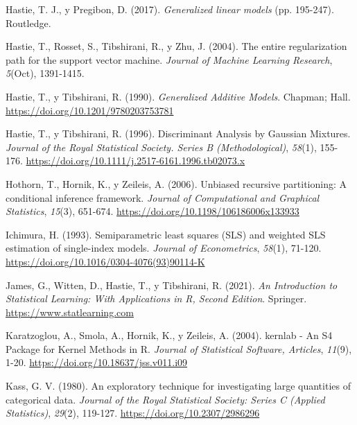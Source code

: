 \documentclass[
]{book}
\newlength{\cslhangindent}
\newlength{\cslentryspacingunit} %
\newenvironment{CSLReferences}[2] %
 {%
  \setlength{\parindent}{0pt}
  \ifodd #1
  \let\oldpar\par
  \def\par{\hangindent=\cslhangindent\oldpar}
  \fi
  \setlength{\parskip}{#2\cslentryspacingunit}
 }%
 {}
\theoremstyle{break}
\theoremstyle{nonumberplain}
\begin{document}
\begin{CSLReferences}{1}{0}
\leavevmode{}%
Hastie, T. J., y Pregibon, D. (2017). \emph{Generalized linear models} (pp. 195-247). Routledge.

\leavevmode{}%
Hastie, T., Rosset, S., Tibshirani, R., y Zhu, J. (2004). The entire regularization path for the support vector machine. \emph{Journal of Machine Learning Research}, \emph{5}(Oct), 1391-1415.

\leavevmode{}%
Hastie, T., y Tibshirani, R. (1990). \emph{Generalized Additive Models}. Chapman; Hall. \url{https://doi.org/10.1201/9780203753781}

\leavevmode{}%
Hastie, T., y Tibshirani, R. (1996). Discriminant Analysis by Gaussian Mixtures. \emph{Journal of the Royal Statistical Society. Series B (Methodological)}, \emph{58}(1), 155-176. \url{https://doi.org/10.1111/j.2517-6161.1996.tb02073.x}

\leavevmode{}%
Hothorn, T., Hornik, K., y Zeileis, A. (2006). Unbiased recursive partitioning: A conditional inference framework. \emph{Journal of Computational and Graphical Statistics}, \emph{15}(3), 651-674. \url{https://doi.org/10.1198/106186006x133933}

\leavevmode{}%
Ichimura, H. (1993). Semiparametric least squares (SLS) and weighted SLS estimation of single-index models. \emph{Journal of Econometrics}, \emph{58}(1), 71-120. \url{https://doi.org/10.1016/0304-4076(93)90114-K}

\leavevmode{}%
James, G., Witten, D., Hastie, T., y Tibshirani, R. (2021). \emph{An Introduction to Statistical Learning: With Applications in R, Second Edition}. Springer. \url{https://www.statlearning.com}

\leavevmode{}%
Karatzoglou, A., Smola, A., Hornik, K., y Zeileis, A. (2004). kernlab - An S4 Package for Kernel Methods in R. \emph{Journal of Statistical Software, Articles}, \emph{11}(9), 1-20. \url{https://doi.org/10.18637/jss.v011.i09}

\leavevmode{}%
Kass, G. V. (1980). An exploratory technique for investigating large quantities of categorical data. \emph{Journal of the Royal Statistical Society: Series C (Applied Statistics)}, \emph{29}(2), 119-127. \url{https://doi.org/10.2307/2986296}


\end{CSLReferences}
\end{document}
